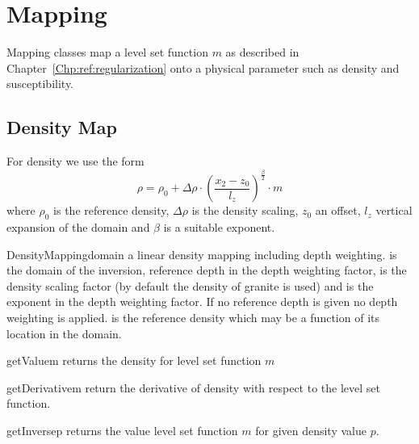 \chapter{Mapping}\label{Chp:ref:mapping}

Mapping classes map a level set function $m$ as described in Chapter~\ref{Chp:ref:regularization}
onto a physical parameter such as density and susceptibility. 

\section{Density Map}\label{Chp:ref:mapping density}
For density we use the form 
\begin{equation}\label{EQU:MAP:1}
\rho =  \rho_{0} + \Delta \rho \cdot \left( \frac{x_2 - z_0}{l_z} \right)^{\frac{\beta}{2}}  \cdot m 
\end{equation}  
where $\rho_{0}$ is the reference density, $\Delta \rho$ is the density scaling, $z_0$ an offset, $l_z$ vertical expansion
of the domain and $\beta$ is a suitable exponent. 

\begin{classdesc}{DensityMapping}{domain
        }
a linear density mapping including depth weighting.  is the
domain of the inversion,  reference depth in the depth weighting
factor,  is the density scaling factor (by default the density of
granite is used) and  is the exponent in the depth weighting factor.
If no reference depth  is given no depth weighting is applied.
 is the reference density which may be a function of its location
in the domain. 
\end{classdesc}

\begin{methoddesc}[DensityMapping]{getValue}{m}
returns the density for level set function $m$
\end{methoddesc}

\begin{methoddesc}[DensityMapping]{getDerivative}{m}
return the derivative of density  with respect to the level set function.
\end{methoddesc}  

\begin{methoddesc}[DensityMapping]{getInverse}{p}
returns the value level set function $m$ for given density value $p$.
\end{methoddesc}



